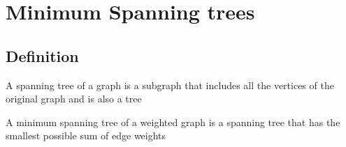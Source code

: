 \section{Minimum Spanning trees}

\subsection{Definition}
\begin{definition}
    A spanning tree of a graph is a subgraph that includes all the vertices of
    the original graph and is also a tree
\end{definition}

\begin{definition}
    A minimum spanning tree of a weighted graph is a spanning tree that has the
    smallest possible sum of edge weights
\end{definition}


